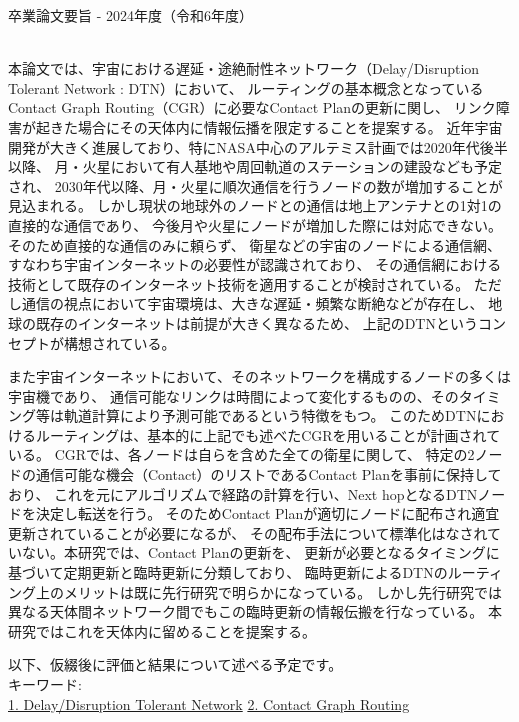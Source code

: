 卒業論文要旨 - 2024年度（令和6年度）
\begin{center}
\begin{large}
\end{large}
\end{center}

~ \\
本論文では、宇宙における遅延・途絶耐性ネットワーク（Delay/Disruption Tolerant Network : DTN）において、
ルーティングの基本概念となっているContact Graph Routing（CGR）に必要なContact Planの更新に関し、
リンク障害が起きた場合にその天体内に情報伝播を限定することを提案する。
近年宇宙開発が大きく進展しており、特にNASA中心のアルテミス計画では2020年代後半以降、
月・火星において有人基地や周回軌道のステーションの建設なども予定され、
2030年代以降、月・火星に順次通信を行うノードの数が増加することが見込まれる。
しかし現状の地球外のノードとの通信は地上アンテナとの1対1の直接的な通信であり、
今後月や火星にノードが増加した際には対応できない。そのため直接的な通信のみに頼らず、
衛星などの宇宙のノードによる通信網、すなわち宇宙インターネットの必要性が認識されており、
その通信網における技術として既存のインターネット技術を適用することが検討されている。
ただし通信の視点において宇宙環境は、大きな遅延・頻繁な断絶などが存在し、
地球の既存のインターネットは前提が大きく異なるため、
上記のDTNというコンセプトが構想されている。

また宇宙インターネットにおいて、そのネットワークを構成するノードの多くは宇宙機であり、
通信可能なリンクは時間によって変化するものの、そのタイミング等は軌道計算により予測可能であるという特徴をもつ。
このためDTNにおけるルーティングは、基本的に上記でも述べたCGRを用いることが計画されている。
CGRでは、各ノードは自らを含めた全ての衛星に関して、
特定の2ノードの通信可能な機会（Contact）のリストであるContact Planを事前に保持しており、
これを元にアルゴリズムで経路の計算を行い、Next hopとなるDTNノードを決定し転送を行う。
そのためContact Planが適切にノードに配布され適宜更新されていることが必要になるが、
その配布手法について標準化はなされていない。本研究では、Contact Planの更新を、
更新が必要となるタイミングに基づいて定期更新と臨時更新に分類しており、
臨時更新によるDTNのルーティング上のメリットは既に先行研究で明らかになっている。
しかし先行研究では異なる天体間ネットワーク間でもこの臨時更新の情報伝搬を行なっている。
本研究ではこれを天体内に留めることを提案する。

以下、仮綴後に評価と結果について述べる予定です。
~ \\


キーワード:\\
\underline{1. Delay/Disruption Tolerant Network} 
\underline{2. Contact Graph Routing} 
\begin{flushright}
\dept \\
\author
\end{flushright}
